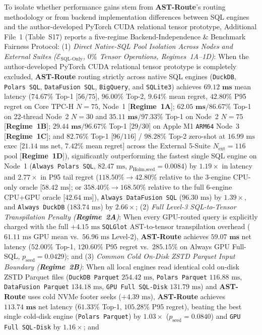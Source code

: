 \documentclass[10pt,a4paper]{article}
\begin{document}
To isolate whether performance gains stem from \textbf{AST-Route}'s routing methodology or from backend implementation differences between SQL engines and the author-developed PyTorch CUDA relational tensor prototype, Additional File~1 (Table~S17) reports a five-regime Backend-Independence \& Benchmark Fairness Protocol:
(1) \emph{Direct Native-SQL Pool Isolation Across Nodes and External Suites ($\mathcal{E}_{\text{SQL-Only}}$, $0\%$ Tensor Operations, Regimes~1A--1D)}: When the author-developed PyTorch CUDA relational tensor prototype is completely excluded, \textbf{AST-Route} routing strictly across native SQL engines (\texttt{DuckDB}, \texttt{Polars SQL}, \texttt{DataFusion SQL}, \texttt{BigQuery}, and \texttt{SQLite3}) achieves $\mathbf{69.12\text{ ms}}$ mean latency ($\mathbf{74.67\%}$ Top-1 [$56/75$], $\mathbf{96.00\%}$ Top-2, $9.64\%$ mean regret, $42.80\%$ P95 regret on Core TPC-H $N=75$, Node~1 [\textbf{Regime~1A}]; $\mathbf{62.05\text{ ms}} / \mathbf{86.67\%}$ Top-1 on 22-thread Node~2 $N=30$ and $\mathbf{35.11\text{ ms}} / \mathbf{97.33\%}$ Top-1 on Node~2 $N=75$ [\textbf{Regime~1B}]; $\mathbf{29.44\text{ ms}} / \mathbf{96.67\%}$ Top-1 [$29/30$] on Apple M1 \texttt{ARM64} Node~3 [\textbf{Regime~1C}]; and $\mathbf{82.76\%}$ Top-1 [$96/116$] / $\mathbf{98.28\%}$ Top-2 zero-shot at $16.99\text{ ms}$ exec [$21.14\text{ ms}$ net, $7.42\%$ mean regret] across the External 5-Suite $N_{\text{ext}}=116$ pool [\textbf{Regime~1D}]), significantly outperforming the fastest single SQL engine on Node~1 (\texttt{Always Polars SQL}, $82.47\text{ ms}$, $p_{\text{Holm,seed}}=0.0084$) by $1.19\times$ in latency and $2.77\times$ in P95 tail regret ($118.50\%\rightarrow 42.80\%$ relative to the 3-engine CPU-only oracle [$58.42\text{ ms}$]; or $358.40\%\rightarrow 168.50\%$ relative to the full 6-engine CPU+GPU oracle [$42.64\text{ ms}$]), \texttt{Always DataFusion SQL} ($96.30\text{ ms}$) by $1.39\times$, and \texttt{Always DuckDB} ($183.74\text{ ms}$) by $2.66\times$;
(2) \emph{Full Level-3 SQL-to-Tensor Transpilation Penalty (\textbf{Regime~2A})}: When every GPU-routed query is explicitly charged with the full $+4.15\text{ ms}$ \texttt{SQLGlot} AST-to-tensor transpilation overhead ($61.11\text{ ms}$ GPU mean vs.\ $56.96\text{ ms}$ Level-2), \textbf{AST-Route} achieves $\mathbf{59.07\text{ ms}}$ net latency ($52.00\%$ Top-1, $120.60\%$ P95 regret vs.\ $285.15\%$ on Always GPU Full-SQL, $p_{\text{seed}}=0.0429$); and
(3) \emph{Common Cold On-Disk ZSTD Parquet Input Boundary (\textbf{Regime~2B})}: When all local engines read identical cold on-disk ZSTD Parquet files (\texttt{DuckDB Parquet} $254.42\text{ ms}$, \texttt{Polars Parquet} $116.88\text{ ms}$, \texttt{DataFusion Parquet} $134.18\text{ ms}$, \texttt{GPU Full SQL-Disk} $131.79\text{ ms}$) and \textbf{AST-Route} uses cold NVMe footer seeks ($+4.39\text{ ms}$), \textbf{AST-Route} achieves $\mathbf{113.74\text{ ms}}$ net latency ($61.33\%$ Top-1, $105.28\%$ P95 regret), beating the best single cold-disk engine (\texttt{Polars Parquet}) by $\mathbf{1.03\times}$ ($p_{\text{seed}}=0.0840$) and \texttt{GPU Full SQL-Disk} by $\mathbf{1.16\times}$; and
\end{document}
